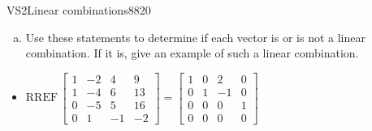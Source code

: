 \begin{exercise}{VS2}{Linear combinations}{8820}
\begin{exerciseStatement}
\begin{enumerate}[(a)]
\begin{itemize}
 \(\left[\begin{array}{c}
8 \\
14 \\
15 \\
-3
\end{array}\right]\)is a linear combination of the vectors \(\left[\begin{array}{c}
1 \\
1 \\
0 \\
0
\end{array}\right] , \left[\begin{array}{c}
-2 \\
-4 \\
-5 \\
1
\end{array}\right] , \text{ and } \left[\begin{array}{c}
4 \\
6 \\
5 \\
-1
\end{array}\right]\). 

 
\end{itemize}

     
\item  

 Use these statements to determine if each vector is or is not a linear combination. If it is, give an example of such a linear combination. 

 
\end{enumerate}

     \end{exerciseStatement}
 \begin{exerciseAnswer} 

\begin{itemize}
\item  

 \(
\mathrm{RREF}\, \left[\begin{array}{ccc|c}
1 & -2 & 4 & 9 \\
1 & -4 & 6 & 13 \\
0 & -5 & 5 & 16 \\
0 & 1 & -1 & -2
\end{array}\right] = \left[\begin{array}{ccc|c}
1 & 0 & 2 & 0 \\
0 & 1 & -1 & 0 \\
0 & 0 & 0 & 1 \\
0 & 0 & 0 & 0
\end{array}\right]
                        \) 


\end{itemize}
\end{exerciseAnswer}
\end{exercise}
